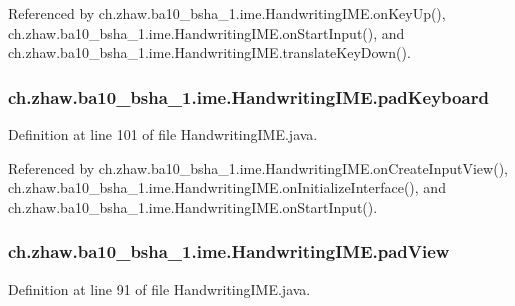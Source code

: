 Referenced by ch.zhaw.ba10\_\-bsha\_\-1.ime.HandwritingIME.onKeyUp(), ch.zhaw.ba10\_\-bsha\_\-1.ime.HandwritingIME.onStartInput(), and ch.zhaw.ba10\_\-bsha\_\-1.ime.HandwritingIME.translateKeyDown().\hypertarget{classch_1_1zhaw_1_1ba10__bsha__1_1_1ime_1_1HandwritingIME_a57cdeb14386f227d3588cf221f32e8d0}{
\subsubsection[{padKeyboard}]{ {\bf ch.zhaw.ba10\_\-bsha\_\-1.ime.HandwritingIME.padKeyboard}}}
\label{classch_1_1zhaw_1_1ba10__bsha__1_1_1ime_1_1HandwritingIME_a57cdeb14386f227d3588cf221f32e8d0}


Definition at line 101 of file HandwritingIME.java.

Referenced by ch.zhaw.ba10\_\-bsha\_\-1.ime.HandwritingIME.onCreateInputView(), ch.zhaw.ba10\_\-bsha\_\-1.ime.HandwritingIME.onInitializeInterface(), and ch.zhaw.ba10\_\-bsha\_\-1.ime.HandwritingIME.onStartInput().\hypertarget{classch_1_1zhaw_1_1ba10__bsha__1_1_1ime_1_1HandwritingIME_a1dd0d971c8e7acd463435307af0b6bcd}{
\subsubsection[{padView}]{ {\bf ch.zhaw.ba10\_\-bsha\_\-1.ime.HandwritingIME.padView}}}
\label{classch_1_1zhaw_1_1ba10__bsha__1_1_1ime_1_1HandwritingIME_a1dd0d971c8e7acd463435307af0b6bcd}


Definition at line 91 of file HandwritingIME.java.

